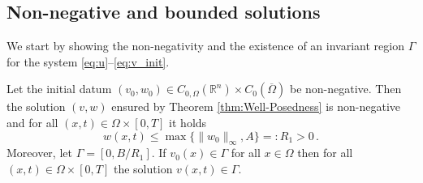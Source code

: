 \documentclass[review,onefignum,onetabnum]{SIAM-styles/siamart171218}
\begin{document}
\subsection{Non-negative and bounded solutions} 
We start by showing the non-negativity and the existence of an invariant region $\Gamma$ for the system \eqref{eq:u}--\eqref{eq:v_init}.
\begin{thm}
    \label{thm:Non-negativity}
     Let the initial datum $(v_0, w_0) \in C_{0, \Omega}(\mathbb{R}^n) \times C_0(\overline{\Omega})$ be non-negative. Then the solution $(v, w)$ ensured by Theorem \ref{thm:Well-Posedness} is non-negative and for all $(x, t) \in \Omega \times [0, T]$ it holds
     \begin{equation}
         w(x,t) \leq \max\{\|w_0\|_\infty, A\} =: R_1 >0\,.
     \end{equation}
     Moreover, let $\Gamma = [0, B/R_1]$. If  $v_0(x) \in \Gamma$ for all $x \in \Omega$ then for all $(x, t) \in \Omega \times [0, T]$ the solution $v(x,t) \in \Gamma$.
\end{thm}
\end{document}
